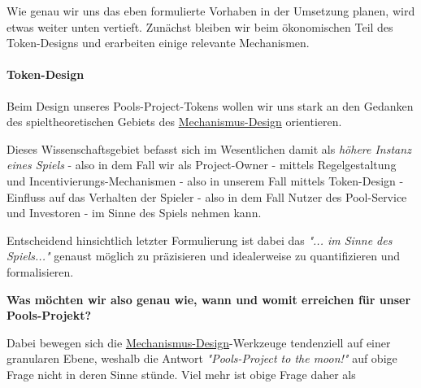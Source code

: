 \vspace{0.3cm}

Wie genau wir uns das eben formulierte Vorhaben in der Umsetzung planen, wird etwas weiter unten vertieft. Zunächst bleiben wir beim ökonomischen Teil des Token-Designs und erarbeiten einige relevante Mechanismen.

\vspace{0.5cm}


\paragraph{Token-Design}
\textbf{ }
\vspace{0.3cm}

Beim Design unseres Pools-Project-Tokens wollen wir uns stark an den Gedanken des spieltheoretischen Gebiets des \href{https://de.wikipedia.org/wiki/Mechanismus-Design-Theorie}{Mechanismus-Design} orientieren.

Dieses Wissenschaftsgebiet befasst sich im Wesentlichen damit als \textit{höhere Instanz eines Spiels} - also in dem Fall wir als Project-Owner - mittels Regelgestaltung und Incentivierungs-Mechanismen - also in unserem Fall mittels Token-Design - Einfluss auf das Verhalten der Spieler - also in dem Fall Nutzer des Pool-Service und Investoren - im Sinne des Spiels nehmen kann.

\vspace{0.1cm}

Entscheidend hinsichtlich letzter Formulierung ist dabei das \textit{"... im Sinne des Spiels..."} genaust möglich zu präzisieren und idealerweise zu quantifizieren und formalisieren.

\vspace{0.5cm}

\textbf{Was möchten wir also genau wie, wann und womit erreichen für unser Pools-Projekt?}

\vspace{0.5cm}

Dabei bewegen sich die \href{https://de.wikipedia.org/wiki/Mechanismus-Design-Theorie}{Mechanismus-Design}-Werkzeuge tendenziell auf einer granularen Ebene, weshalb die Antwort \textit{"Pools-Project to the moon!"} auf obige Frage nicht in deren Sinne stünde. Viel mehr ist obige Frage daher als

